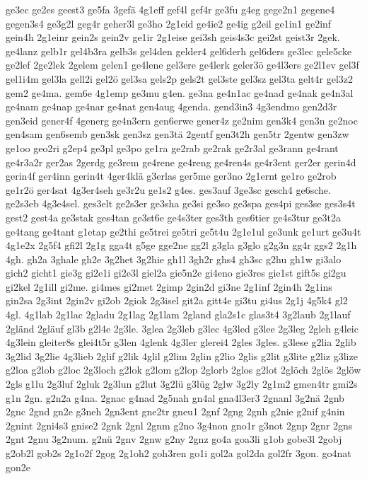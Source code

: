 {ge3ec
ge2es
geest3
ge5fa
3gefä
4g1eff
gef4l
gef4r
ge3fu
g4eg
gege2n1
gegene4
gegen3s4
ge3g2l
geg4r
geher3l
ge3ho
2g1eid
ge4ie2
ge4ig
g2eil
ge1in1
ge2inf
gein4h
2g1einr
gein2s
gein2v
ge1ir
2g1eise
gei3sh
geis4s3c
gei2st
geist3r
2gek.
ge4lanz
gelb1r
gel4b3ra
gelb3s
gel4den
gelder4
gel6derh
gel6ders
ge3lec
gele5cke
ge2lef
2ge2lek
2gelem
gelen1
ge4lene
gel3ere
ge4lerk
geler3ö
ge4l3ers
ge2l1ev
gel3f
gel1i4m
gel3la
gell2i
gel2ö
gel3sa
gels2p
gels2t
gel3ste
gel3sz
gel3ta
gelt4r
gel3z2
gem2
ge4ma.
gem6e
4g1emp
ge3mu
g4en.
ge3na
ge4n1ac
ge4nad
ge4nak
ge4n3al
ge4nam
ge4nap
ge4nar
ge4nat
gen4aug
4genda.
gend3in3
4g3endmo
gen2d3r
gen3eid
gener4f
4generg
ge4n3ern
gen6erwe
gener4z
ge2nim
gen3k4
gen3n
ge2noc
gen4sam
gen6semb
gen3sk
gen3sz
gen3tä
2gentf
gen3t2h
gen5tr
2gentw
gen3zw
ge1oo
geo2ri
g2ep4
ge3pl
ge3po
ge1ra
ge2rab
ge2rak
ge2r3al
ge3rann
ge4rant
ge4r3a2r
ger2as
2gerdg
ge3rem
ge4rene
ge4reng
ge4ren4s
ge4r3ent
ger2er
gerin4d
gerin4f
ger4inn
gerin4t
4ger4klä
g3erlas
ger5me
ger3no
2g1ernt
ge1ro
ge2rob
ge1r2ö
ger4sat
4g3er4seh
ge3r2u
ge1s2
g4es.
ges3auf
3ge3sc
gesch4
ge6sche.
ge2s3eb
4g3e4sel.
ges3elt
ge2s3er
ge3sha
ge3si
ge3so
ge3spa
ges4pi
ges3se
ges3s4t
gest2
gest4a
ge3stak
ges4tan
ge3st6e
ge4s3ter
ges3th
ges6tier
ge4s3tur
ge3t2a
ge4tang
ge4tant
g1etap
ge2thi
ge5trei
ge5tri
ge5t4u
2g1e1ul
ge3unk
ge1urt
ge3u4t
4g1e2x
2g5f4
gfi2l
2g1g
gga4t
g5ge
gge2ne
gg2l
g3gla
g3glo
g2g3n
gg4r
ggs2
2g1h
4gh.
gh2a
3ghale
gh2e
3g2het
3g2hie
gh1l
3gh2r
ghs4
gh3sc
g2hu
gh1w
gi3alo
gich2
gicht1
gie3g
gi2e1i
gi2e3l
giel2a
gie5n2e
gi4eno
gie3res
gie1st
gift5s
gi2gu
gi2kel
2g1ill
gi2me.
gi4mes
gi2met
2gimp
2gin2d
gi3ne
2g1inf
2gin4h
2g1ins
gin2sa
2g3int
2gin2v
gi2ob
2giok
2g3isel
git2a
gitt4e
gi3tu
gi4us
2g1j
4g5k4
gl2
4gl.
4g1lab
2g1lac
2gladu
2g1lag
2g1lam
2gland
gla2s1c
glas3t4
3g2laub
2g1lauf
2gländ
2gläuf
gl3b
g2l4e
2g3le.
3glea
2g3leb
g3lec
4g3led
g3lee
2g3leg
2gleh
g4leic
4g3lein
gleiter8s
glei4t5r
g3len
4glenk
4g3ler
glerei4
2gles
3gles.
g3lese
g2lia
2glib
3g2lid
3g2lie
4g3lieb
2glif
g2lik
4glil
g2lim
2glin
g2lio
2glis
g2lit
g3lite
g2liz
g3lize
g2loa
g2lob
g2loc
2g3loch
g2lok
g2lom
g2lop
2glorb
2glos
g2lot
2glöch
2glös
2glöw
2gls
g1lu
2g3luf
2gluk
2g3lun
g2lut
3g2lü
g3lüg
2glw
3g2ly
2g1m2
gmen4tr
gmi2s
g1n
2gn.
g2n2a
g4na.
2gnac
g4nad
2g5nah
gn4al
gna4l3er3
2gnanl
3g2nä
2gnb
2gnc
2gnd
gn2e
g3neh
2gn3ent
gne2tr
gneu1
2gnf
2gng
2gnh
g2nie
g2nif
g4nin
2gnint
2gni4s3
gnise2
2gnk
2gnl
2gnm
g2no
3g4non
gno1r
g3not
2gnp
2gnr
2gns
2gnt
2gnu
3g2num.
g2nü
2gnv
2gnw
g2ny
2gnz
go4a
goa3li
g1ob
gobe3l
2gobj
g2ob2l
gob2s
2g1o2f
2gog
2g1oh2
goh3ren
go1i
gol2a
gol2da
gol2fr
3gon.
go4nat
gon2e
}
